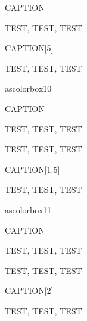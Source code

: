 \begin{ascolorbox9}{CAPTION}

TEST, TEST, TEST

\end{ascolorbox9}




\begin{ascolorbox9}{CAPTION}[5]

TEST, TEST, TEST

\end{ascolorbox9}

ascolorbox10

\begin{ascolorbox10}{CAPTION}

TEST, TEST, TEST

\end{ascolorbox10}

\begin{ascolorbox10}{}

TEST, TEST, TEST

\end{ascolorbox10}

\begin{ascolorbox10}{CAPTION}[1.5]

TEST, TEST, TEST

\end{ascolorbox10}

ascolorbox11

\begin{ascolorbox11}{CAPTION}

TEST, TEST, TEST

\end{ascolorbox11}

\begin{ascolorbox11}{}

TEST, TEST, TEST

\end{ascolorbox11}

\begin{ascolorbox11}{CAPTION}[2]

TEST, TEST, TEST

\end{ascolorbox11}

